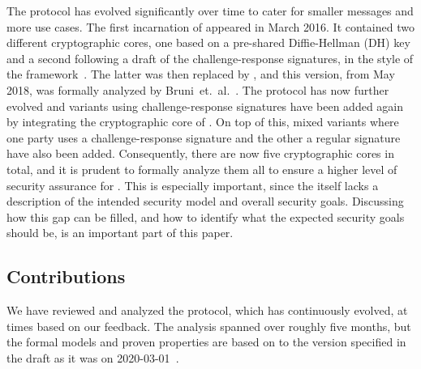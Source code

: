 \documentclass[runningheads, envcountsame, a4paper, draft, x11names]{llncs}
\newcommand{\spacehack}{\vspace{-1em}}
\newcommand{\fillhack}{\vspace{-0.5em}}
\begin{document}
The \mEdhoc{} protocol has evolved significantly over time to cater for smaller
messages and more use cases.
%
The first incarnation of \mEdhoc{} appeared in March 2016.
%
It contained two different cryptographic cores, one based on a
pre-shared Diffie-Hellman (DH) key and a second following a draft of the
challenge-response signatures, in the style of the \mNoise{}
framework~\cite{perrin2016noise}.
%
The latter was then replaced by \mSigma, and this version, from May 2018, was
formally analyzed by Bruni~et.~al.~\cite{DBLP:conf/secsr/BruniJPS18}.
%
The protocol has now further evolved and variants using challenge-response
signatures have been added again by integrating the cryptographic core of
\mOptls{}.
%
On top of this, mixed variants where one party uses a challenge-response
signature and the other a regular signature have also been added.
%
Consequently, there are now five cryptographic cores in total, and it is prudent
to formally analyze them all to ensure a higher level of security assurance for
\mEdhoc.
%
This is especially important, since the \mSpec{} itself lacks a description
of the intended security model and overall security goals.
%
Discussing how this gap can be filled, and how to identify what the expected
security goals should be, is an important part of this paper.
%

\spacehack
\subsection{Contributions}
\label{sec:contributions}
\fillhack
We have reviewed and analyzed the \mEdhoc{} protocol, which has continuously
evolved, at times based on our feedback.
%
The analysis spanned over roughly five months, but the formal models and proven
properties are based on to the version specified in the draft as it was on
2020-03-01~\cite{selander-lake-edhoc-01}.
\end{document}
